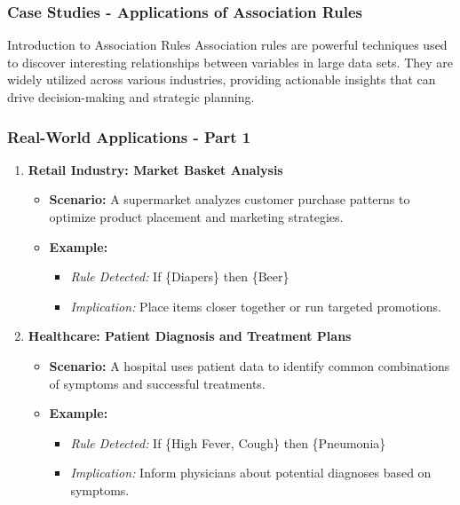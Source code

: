 \documentclass[aspectratio=169]{beamer}
\begin{document}
\begin{frame}[fragile]
    \frametitle{Case Studies - Applications of Association Rules}
    \begin{block}{Introduction to Association Rules}
        Association rules are powerful techniques used to discover interesting relationships between variables in large data sets. They are widely utilized across various industries, providing actionable insights that can drive decision-making and strategic planning.
    \end{block}
\end{frame}

\begin{frame}[fragile]
    \frametitle{Real-World Applications - Part 1}
    \begin{enumerate}
        \item \textbf{Retail Industry: Market Basket Analysis}
            \begin{itemize}
                \item \textbf{Scenario:} A supermarket analyzes customer purchase patterns to optimize product placement and marketing strategies.
                \item \textbf{Example:}
                    \begin{itemize}
                        \item \textit{Rule Detected:} If \{Diapers\} then \{Beer\}
                        \item \textit{Implication:} Place items closer together or run targeted promotions.
                    \end{itemize}
            \end{itemize}
        
        \item \textbf{Healthcare: Patient Diagnosis and Treatment Plans}
            \begin{itemize}
                \item \textbf{Scenario:} A hospital uses patient data to identify common combinations of symptoms and successful treatments.
                \item \textbf{Example:}
                    \begin{itemize}
                        \item \textit{Rule Detected:} If \{High Fever, Cough\} then \{Pneumonia\}
                        \item \textit{Implication:} Inform physicians about potential diagnoses based on symptoms.
                    \end{itemize}
            \end{itemize}
    \end{enumerate}
\end{frame}
\end{document}
